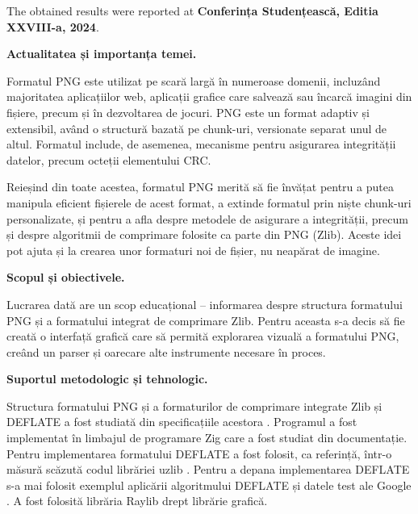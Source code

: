 \documentclass[a4paper,12pt]{report}
\renewcommand{\year}{2024}
\newcommand{\conferencesList}{Conferința Studențească, Editia XXVIII-a, \year}
\begin{document}
The obtained results were reported at \textbf{\conferencesList}\cite{self}.

\clearpage
{}
\begin{acronym}[JPEG]
\end{acronym}

\introChapter

\textbf{Actualitatea și importanța temei.}

Formatul \ac{PNG} este utilizat pe scară largă în numeroase domenii, incluzând majoritatea aplicațiilor
web, aplicații grafice care salvează sau încarcă imagini din fișiere, precum și în dezvoltarea de jocuri.
\ac{PNG} este un format adaptiv și extensibil, având o structură bazată pe chunk-uri, versionate separat unul
de altul. Formatul include, de asemenea, mecanisme pentru asigurarea integrității datelor, precum
octeții elementului \ac{CRC}.

Reieșind din toate acestea, formatul \ac{PNG} merită să fie învățat pentru a putea manipula eficient fișierele de
acest format, a extinde formatul prin niște chunk-uri personalizate, și pentru a afla despre
metodele de asigurare a integrității, precum și despre algoritmii de comprimare folosite ca parte din \ac{PNG}
(Zlib). Aceste idei pot ajuta și la crearea unor formaturi noi de fișier, nu neapărat de imagine.

\textbf{Scopul și obiectivele.}

Lucrarea dată are un scop educațional -- informarea despre structura formatului \acs{PNG} și a
formatului integrat de comprimare Zlib.
Pentru aceasta s-a decis să fie creată o interfață grafică care
să permită explorarea vizuală a formatului \ac{PNG},
creând un parser și oarecare alte instrumente necesare în proces.


\textbf{Suportul metodologic și tehnologic.}

Structura formatului \ac{PNG} și a formaturilor de comprimare integrate Zlib și DEFLATE
a fost studiată din specificațiile acestora \cite{png_spec} \cite{zlib_spec} \cite{deflate_spec}.
Programul a fost implementat în limbajul de programare Zig \cite{zig} care a fost studiat din documentație.
Pentru implementarea formatului DEFLATE a fost folosit, ca referință, într-o măsură scăzută codul librăriei uzlib \cite{gzip_impl}.
Pentru a depana implementarea DEFLATE s-a mai folosit exemplul aplicării algoritmului DEFLATE și datele test ale Google \cite{deflate_tests}.
A fost folosită librăria Raylib \cite{raylib} drept librărie grafică.
\end{document}
